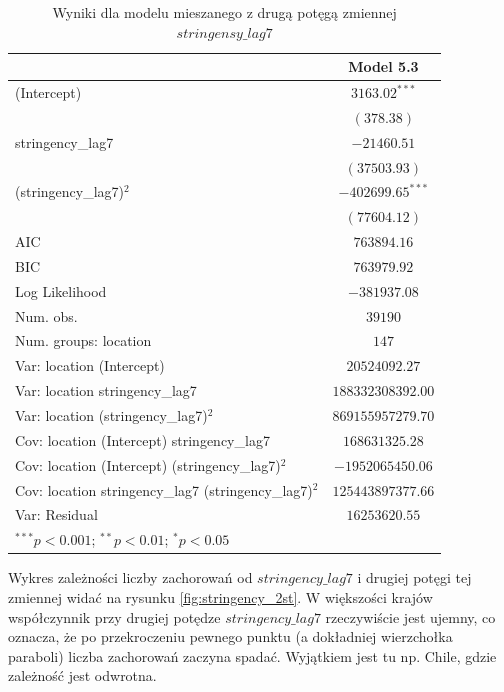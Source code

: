 \documentclass[12pt]{mwbk}
\theoremstyle{plain}
\theoremstyle{definition}
\theoremstyle{definition}
\begin{document}
\begin{table}
	\begin{center}
		\begin{tabular}{l c}
			\hline
			& Model 5.3 \\
			\hline
			(Intercept)                                                         & $3163.02^{***}$    \\
			& $(378.38)$         \\
			stringency\_lag7                                          & $-21460.51$        \\
			& $(37503.93)$       \\
			(stringency\_lag7)$^2$                                          & $-402699.65^{***}$ \\
			& $(77604.12)$       \\
			\hline
			AIC                                                                 & $763894.16$        \\
			BIC                                                                 & $763979.92$        \\
			Log Likelihood                                                      & $-381937.08$       \\
			Num. obs.                                                           & $39190$            \\
			Num. groups: location                                               & $147$              \\
			Var: location (Intercept)                                           & $20524092.27$      \\
			Var: location stringency\_lag7                            & $188332308392.00$  \\
			Var: location (stringency\_lag7)$^2$                            & $869155957279.70$  \\
			Cov: location (Intercept) stringency\_lag7                & $168631325.28$     \\
			Cov: location (Intercept) (stringency\_lag7)$^2$                & $-1952065450.06$   \\
			Cov: location stringency\_lag7 (stringency\_lag7)$^2$ & $125443897377.66$  \\
			Var: Residual                                                       & $16253620.55$      \\
			\hline
			\multicolumn{2}{l}{\scriptsize{$^{***}p<0.001$; $^{**}p<0.01$; $^{*}p<0.05$}}
		\end{tabular}
		\caption{Wyniki dla modelu mieszanego z drugą potęgą zmiennej $stringensy\_lag7$}
		\label{table:mod5-2st}
	\end{center}
\end{table}
\newpage
Wykres zależności liczby zachorowań od $stringency\_lag7$ i drugiej potęgi tej zmiennej widać na rysunku \ref{fig:stringency_2st}. W większości krajów współczynnik przy drugiej potędze $stringency\_lag7$ rzeczywiście jest ujemny, co oznacza, że po przekroczeniu pewnego punktu (a dokładniej wierzchołka paraboli) liczba zachorowań zaczyna spadać. Wyjątkiem jest tu np. Chile, gdzie zależność jest odwrotna.
\end{document}
